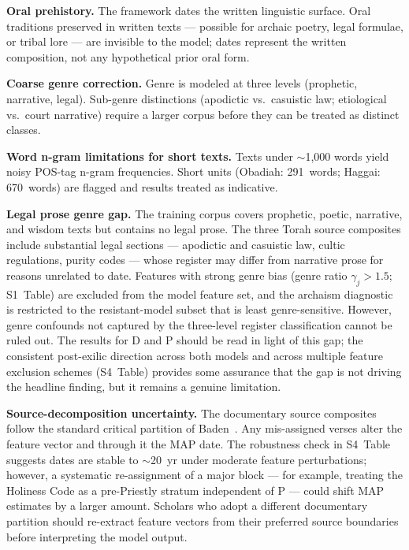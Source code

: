 \documentclass[10pt,letterpaper]{article}
\begin{document}
\textbf{Oral prehistory.}  The framework dates the written linguistic
surface.  Oral traditions preserved in written texts --- possible for
archaic poetry, legal formulae, or tribal lore --- are invisible to the
model; dates represent the written composition, not any hypothetical
prior oral form.

\textbf{Coarse genre correction.}  Genre is modeled at three levels
(prophetic, narrative, legal).  Sub-genre distinctions
(apodictic vs.\ casuistic law; etiological vs.\ court narrative) require
a larger corpus before they can be treated as distinct classes.

\textbf{Word n-gram limitations for short texts.}  Texts under
$\sim$1{,}000 words yield noisy POS-tag n-gram frequencies.  Short units
(Obadiah: 291~words; Haggai: 670~words) are flagged and results treated
as indicative.

\textbf{Legal prose genre gap.}  The training corpus covers prophetic,
poetic, narrative, and wisdom texts but contains no legal prose.  The
three Torah source composites include substantial legal sections ---
apodictic and casuistic law, cultic regulations, purity codes --- whose
register may differ from narrative prose for reasons unrelated to date.
Features with strong genre bias (genre ratio $\gamma_j > 1.5$; S1~Table)
are excluded from the model feature set, and the archaism diagnostic is
restricted to the resistant-model subset that is least genre-sensitive.
However, genre confounds not captured by the three-level register
classification cannot be ruled out.  The results for D and P should be
read in light of this gap; the consistent post-exilic direction across
both models and across multiple feature exclusion schemes (S4~Table)
provides some assurance that the gap is not driving the headline finding,
but it remains a genuine limitation.

\textbf{Source-decomposition uncertainty.}  The documentary source
composites follow the standard critical partition of Baden~\cite{Baden2012}.
Any mis-assigned verses alter the feature vector and through it the MAP
date.  The robustness check in S4~Table suggests dates are stable to
$\sim$20~yr under moderate feature perturbations; however, a systematic
re-assignment of a major block --- for example, treating the Holiness Code
as a pre-Priestly stratum independent of P --- could shift MAP estimates
by a larger amount.  Scholars who adopt a different documentary partition
should re-extract feature vectors from their preferred source boundaries
before interpreting the model output.
\end{document}
